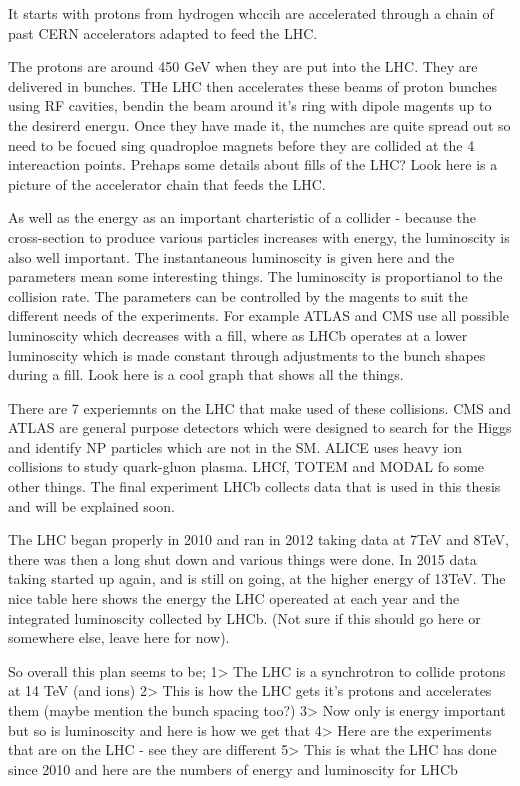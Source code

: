 It starts with protons from hydrogen whccih are accelerated through a chain of past CERN accelerators adapted to feed the LHC. 

The protons are around 450 GeV when they are put into the LHC. They are delivered in bunches. THe LHC then accelerates these beams of proton bunches using RF cavities, bendin the beam around it's ring with dipole magents up to the desirerd energu. Once they have made it, the numches are quite spread out so need to be focued sing quadroploe magnets before they are collided at the 4 intereaction points. Prehaps some details about fills of the LHC? Look here is a picture of the accelerator chain that feeds the LHC. 

As well as the energy as an important charteristic of a collider - because the cross-section to produce various particles increases with energy, the luminoscity  is also well important. The instantaneous luminoscity is given here and the parameters mean some interesting things. The luminoscity is proportianol to the collision rate. The parameters can be controlled by the magents to suit the different needs of the experiments. For example ATLAS and CMS use all possible luminoscity which decreases with a fill, where as LHCb operates at a lower luminoscity which is made constant through adjustments to the bunch shapes during a fill. Look here is a cool graph that shows all the things.

There are 7 experiemnts on the LHC that make used of these collisions. CMS and ATLAS are general purpose detectors which were designed to search for the Higgs and identify NP particles which are not in the SM. ALICE uses heavy ion collisions to study quark-gluon plasma. LHCf, TOTEM and MODAL fo some other things. The final experiment LHCb collects data that is used in this thesis and will be explained soon.

The LHC began properly in 2010 and ran in 2012 taking data at 7TeV and 8TeV, there was then a long shut down and various things were done. In 2015 data taking started up again, and is still on going, at the higher energy of 13TeV. The nice table here shows the energy the LHC opereated at each year and the integrated luminoscity collected by LHCb. (Not sure if this should go here or somewhere else, leave here for now).



So overall this plan seems to be;
1> The LHC is a synchrotron to collide protons at 14 TeV (and ions)
2> This is how the LHC gets it's protons and accelerates them (maybe mention the bunch spacing too?)
3> Now only is energy important but so is luminoscity and here is how we get that
4> Here are the experiments that are on the LHC - see they are different
5> This is what the LHC has done since 2010 and here are the numbers of energy and luminoscity for LHCb 

